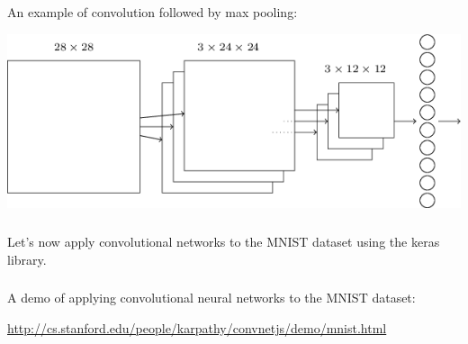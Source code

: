 \documentclass[xetex,mathserif,serif,aspectratio=169]{beamer}
\begin{document}
\begin{frame}[fragile] \frametitle{} \oldB \small

An example of convolution followed by max pooling:

\begin{center}
\includegraphics[height=0.5\textheight]{img/tikz49.png}
\end{center}

\end{frame}

\begin{frame}[fragile] \frametitle{} \oldB \small

Let's now apply convolutional networks to the MNIST dataset using
the keras library.

\end{frame}

\begin{frame}[fragile] \frametitle{} \oldB \small

A demo of applying convolutional neural networks to the MNIST dataset:

\begin{center}
\url{http://cs.stanford.edu/people/karpathy/convnetjs/demo/mnist.html}
\end{center}

\end{frame}
\end{document}

